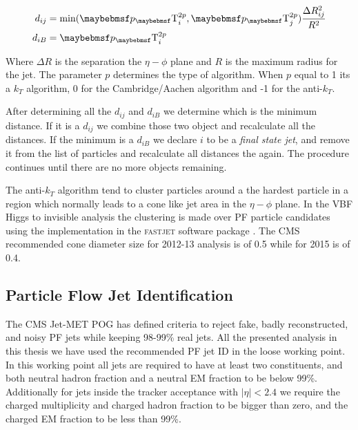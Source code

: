 \begin{align}
d_{ij} &= \text{min}({\pT}_{i}^{2p},{\pT}_{j}^{2p})\frac{\Delta R_{ij}^{2}}{R^{2}} \label{EQUATION:EventReconstructionAndSimulation_AKDistances1} \\
d_{iB} &= {\pT}_{i}^{2p}\ \label{EQUATION:EventReconstructionAndSimulation_AKDistances2} 
\end{align}

Where $\Delta R$ is the separation the $\eta-\phi$ plane and $R$ is the maximum radius for the jet. The parameter $p$ determines the type of algorithm. When $p$ equal to 1 its a $k_T$ algorithm, 0 for the Cambridge/Aachen algorithm and -1 for the anti-$k_T$. 

After determining all the $d_{ij}$ and $d_{iB}$ we determine which is the minimum distance. If it is a $d_{ij}$ we combine those two object and recalculate all the distances. If the minimum is a $d_{iB}$ we declare $i$ to be a \textit{final state jet}, and remove it from the list of particles and recalculate all distances the again. The procedure continues until there are no more objects remaining.

The anti-$k_T$ algorithm tend to cluster particles around a the hardest particle in a region which normally leads to a cone like jet area in the $\eta-\phi$ plane. In the \gls{VBF} Higgs to invisible analysis the clustering is made over \gls{PF} particle candidates using the implementation in the \textsc{fastjet} software package \cite{ARTICLE:FastJetUserManual}. The \gls{CMS} recommended cone diameter size for 2012-13 analysis is of 0.5 while for 2015 is of 0.4.


\subsection{Particle Flow Jet Identification} 
\label{SECTION:EventReconstructionAndSimulation_Jets_ParticleFlowJetID}



The \gls{CMS} Jet-MET \gls{POG} has defined criteria to reject fake, badly reconstructed, and noisy \gls{PF} jets while keeping 98-99\% real jets. All the presented analysis in this thesis we have used the recommended \gls{PF} jet \gls{ID} in the loose working point. In this working point all jets are required to have at least two constituents, and both neutral hadron fraction and a neutral \gls{EM} fraction to be below 99\%. Additionally for jets inside the tracker acceptance with $|\eta| < 2.4$ we require the charged multiplicity and charged hadron fraction to be bigger than zero, and the charged \gls{EM} fraction to be less than 99\%.

